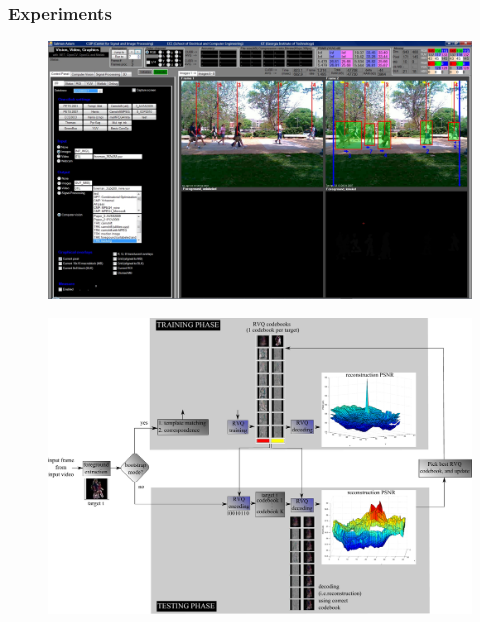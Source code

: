 \begin{frame}
\frametitle{Experiments}
\logoCSIPCPL\mypagenum
	\begin{figure}		
		\centering		
		\includegraphics[width=1.0\textwidth]{figs/Proposal_fig3_RVQ_MTT_snapshot_VVG}
		\label{fig:snapshot_VVG}
	\end{figure}	
\end{frame}


\begin{frame}[plain]
	\begin{changemargin}{-1.3in}{0in}
	\begin{figure}		
		\includegraphics[width=1.37\textwidth]{figs/RVQ_TRK_IPCV2010_BlockDiagram_detailed.pdf}
	\end{figure}	
	\end{changemargin}
\end{frame}


